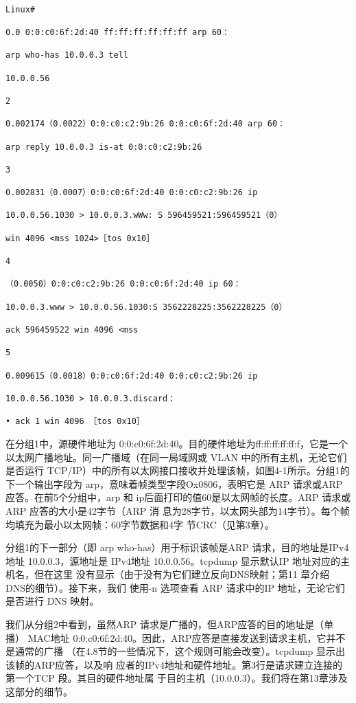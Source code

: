\begin{verbatim}
    
Linux#

0.0 0:0:c0:6f:2d:40 ff:ff:ff:ff:ff:ff arp 60：

arp who-has 10.0.0.3 tell

10.0.0.56

2

0.002174（0.0022）0:0:c0:c2:9b:26 0:0:c0:6f:2d:40 arp 60：

arp reply 10.0.0.3 is-at 0:0:c0:c2:9b:26

3

0.002831（0.0007）0:0:c0:6f:2d:40 0:0:c0:c2:9b:26 ip

10.0.0.56.1030 > 10.0.0.3.wWw: S 596459521:596459521（0）

win 4096 <mss 1024>［tos 0x10］

4

（0.0050）0:0:c0:c2:9b:26 0:0:c0:6f:2d:40 ip 60：

10.0.0.3.www > 10.0.0.56.1030:S 3562228225:3562228225（0）

ack 596459522 win 4096 <mss

5

0.009615（0.0018）0:0:c0:6f:2d:40 0:0:c0:c2:9b:26 ip

10.0.0.56.1030 > 10.0.0.3.discard：

• ack 1 win 4096 ［tos 0x10］
\end{verbatim}

在分组1中，源硬件地址为 0:0:c0:6f:2d:40。目的硬件地址为ff:ff:ff:ff:ff:f，它是一个
以太网广播地址。同一广播域（在同一局域网或 VLAN 中的所有主机，无论它们是否运行
TCP/IP）中的所有以太网接口接收并处理该帧，如图4-1所示。分组1的下一个输出字段为
arp，意味着帧类型字段Ox0806，表明它是 ARP 请求或ARP应答。在前5个分组中，arp
和 ip后面打印的值60是以太网帧的长度。ARP 请求或ARP 应答的大小是42字节（ARP 消
息为28字节，以太网头部为14字节）。每个帧均填充为最小以太网帧：60字节数据和4字
节CRC（见第3章）。

分组1的下一部分（即 arp who-has）用于标识该帧是ARP 请求，目的地址是IPv4地址
10.0.0.3，源地址是 IPv4地址 10.0.0.56。tcpdump 显示默认IP 地址对应的主机名，但在这里
没有显示（由于没有为它们建立反向DNS映射；第11 章介绍 DNS的细节）。接下来，我们
使用-n 选项查看 ARP 请求中的IP 地址，无论它们是否进行 DNS 映射。

我们从分组2中看到，虽然ARP 请求是广播的，但ARP应答的目的地址是（单播）
MAC地址 0:0:c0:6f:2d:40。因此，ARP应答是直接发送到请求主机，它并不是通常的广播
（在4.8节的一些情况下，这个规则可能会改变）。tcpdump 显示出该帧的ARP应答，以及响
应者的IPv4地址和硬件地址。第3行是请求建立连接的第一个TCP 段。其目的硬件地址属
于目的主机（10.0.0.3）。我们将在第13章涉及这部分的细节。


